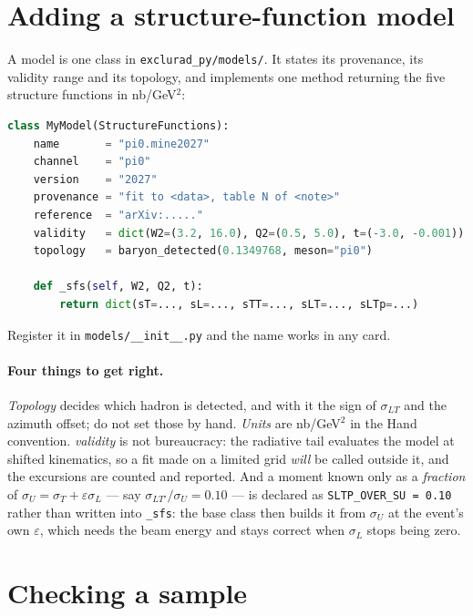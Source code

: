 \documentclass[11pt]{article}
\newcommand{\code}[1]{\texttt{#1}}
\begin{document}
\section{Adding a structure-function model}

A model is one class in \code{exclurad\_py/models/}. It states its
provenance, its validity range and its topology, and implements one method
returning the five structure functions in nb/GeV$^2$:

\begin{lstlisting}[language=Python]
class MyModel(StructureFunctions):
    name       = "pi0.mine2027"
    channel    = "pi0"
    version    = "2027"
    provenance = "fit to <data>, table N of <note>"
    reference  = "arXiv:....."
    validity   = dict(W2=(3.2, 16.0), Q2=(0.5, 5.0), t=(-3.0, -0.001))
    topology   = baryon_detected(0.1349768, meson="pi0")

    def _sfs(self, W2, Q2, t):
        return dict(sT=..., sL=..., sTT=..., sLT=..., sLTp=...)
\end{lstlisting}

Register it in \code{models/\_\_init\_\_.py} and the name works in any card.

\paragraph{Four things to get right.}
\emph{Topology} decides which hadron is detected, and with it the sign of
$\sigma_{LT}$ and the azimuth offset; do not set those by hand. \emph{Units}
are nb/GeV$^2$ in the Hand convention. \emph{validity} is not bureaucracy: the
radiative tail evaluates the model at shifted kinematics, so a fit made on a
limited grid \emph{will} be called outside it, and the excursions are counted
and reported. And a moment known only as a \emph{fraction} of
$\sigma_U=\sigma_T+\varepsilon\sigma_L$ --- say
$\sigma_{LT'}/\sigma_U = 0.10$ --- is declared as
\code{SLTP\_OVER\_SU = 0.10} rather than written into \code{\_sfs}: the base
class then builds it from $\sigma_U$ at the event's own $\varepsilon$, which
needs the beam energy and stays correct when $\sigma_L$ stops being zero.

\section{Checking a sample}
\label{sec:check}
\end{document}
